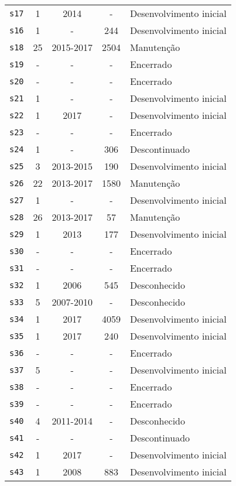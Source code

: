 \begin{longtable}{ l c c c l }
    \texttt{s17} & 1 & 2014 & - & Desenvolvimento inicial \\
    \texttt{s16} & 1 & - & 244 & Desenvolvimento inicial \\
    \texttt{s18} & 25 & 2015-2017 & 2504 & Manutenção \\
    \texttt{s19} & - & - & - & Encerrado \\
    \texttt{s20} & - & - & - & Encerrado \\
    \texttt{s21} & 1 & - & - & Desenvolvimento inicial \\
    \texttt{s22} & 1 & 2017 & - & Desenvolvimento inicial \\
    \texttt{s23} & - & - & - & Encerrado \\
    \texttt{s24} & 1 & - & 306 & Descontinuado \\
    \texttt{s25} & 3 & 2013-2015 & 190 & Desenvolvimento inicial \\
    \texttt{s26} & 22 & 2013-2017 & 1580 & Manutenção \\
    \texttt{s27} & 1 & - & - & Desenvolvimento inicial \\
    \texttt{s28} & 26 & 2013-2017 & 57 & Manutenção \\
    \texttt{s29} & 1 & 2013 & 177 & Desenvolvimento inicial \\
    \texttt{s30} & - & - & - & Encerrado \\
    \texttt{s31} & - & - & - & Encerrado \\
    \texttt{s32} & 1 & 2006 & 545 & Desconhecido \\
    \texttt{s33} & 5 & 2007-2010 & - & Desconhecido \\
    \texttt{s34} & 1 & 2017 & 4059 & Desenvolvimento inicial \\
    \texttt{s35} & 1 & 2017 & 240 & Desenvolvimento inicial \\
    \texttt{s36} & - & - & - & Encerrado \\
    \texttt{s37} & 5 & - & - & Desenvolvimento inicial \\
    \texttt{s38} & - & - & - & Encerrado \\
    \texttt{s39} & - & - & - & Encerrado \\
    \texttt{s40} & 4 & 2011-2014 & - & Desconhecido \\
    \texttt{s41} & - & - & - & Descontinuado \\
    \texttt{s42} & 1 & 2017 & - & Desenvolvimento inicial \\
    \texttt{s43} & 1 & 2008 & 883 & Desenvolvimento inicial \\

\end{longtable}
